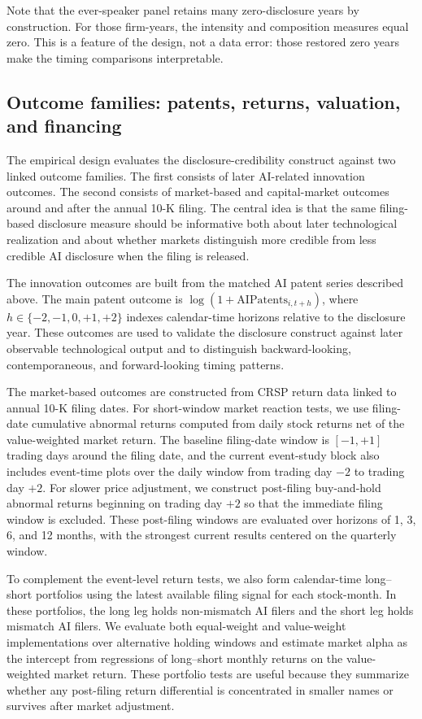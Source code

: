 Note that the ever-speaker panel retains many zero-disclosure years by construction. For those firm-years, the intensity and composition measures equal zero. This is a feature of the design, not a data error: those restored zero years make the timing comparisons interpretable.

\subsection{Outcome families: patents, returns, valuation, and financing}

The empirical design evaluates the disclosure-credibility construct against two linked outcome families. The first consists of later AI-related innovation outcomes. The second consists of market-based and capital-market outcomes around and after the annual 10-K filing. The central idea is that the same filing-based disclosure measure should be informative both about later technological realization and about whether markets distinguish more credible from less credible AI disclosure when the filing is released.

The innovation outcomes are built from the matched AI patent series described above. The main patent outcome is $\log(1+\mathrm{AIPatents}_{i,t+h})$, where $h \in \{-2,-1,0,+1,+2\}$ indexes calendar-time horizons relative to the disclosure year. These outcomes are used to validate the disclosure construct against later observable technological output and to distinguish backward-looking, contemporaneous, and forward-looking timing patterns.

The market-based outcomes are constructed from CRSP return data linked to annual 10-K filing dates. For short-window market reaction tests, we use filing-date cumulative abnormal returns computed from daily stock returns net of the value-weighted market return. The baseline filing-date window is $[-1,+1]$ trading days around the filing date, and the current event-study block also includes event-time plots over the daily window from trading day $-2$ to trading day $+2$. For slower price adjustment, we construct post-filing buy-and-hold abnormal returns beginning on trading day $+2$ so that the immediate filing window is excluded. These post-filing windows are evaluated over horizons of 1, 3, 6, and 12 months, with the strongest current results centered on the quarterly window.

To complement the event-level return tests, we also form calendar-time long--short portfolios using the latest available filing signal for each stock-month. In these portfolios, the long leg holds non-mismatch AI filers and the short leg holds mismatch AI filers. We evaluate both equal-weight and value-weight implementations over alternative holding windows and estimate market alpha as the intercept from regressions of long--short monthly returns on the value-weighted market return. These portfolio tests are useful because they summarize whether any post-filing return differential is concentrated in smaller names or survives after market adjustment.

